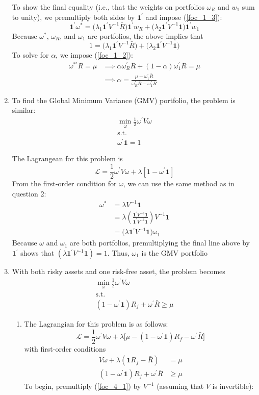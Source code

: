 \documentclass[11pt]{article}
\newcommand{\w}{\omega}
\newcommand{\p}{\prime}
\newcommand{\one}{\mathbf{1}}
\newcommand{\onep}{\mathbf{1}^\prime}
\newcommand{\lagr}{\mathcal{L}}
\newcommand{\inv}[1]{#1^{-1}}
\renewcommand{\wp}{\omega^\prime}
\begin{document}
\begin{enumerate}
	To show the final equality (i.e., that the weights on portfolios $ \w_R $ and $ w_1 $ sum to unity), we premultiply both sides by $ \one^\p $ and impose  (\ref{foc_1_3}):
	\[\onep \w^*= \big(\lambda_1\one^\p \inv{V}\bar{R}\big)\onep w_R + \big(\lambda_2\one^\p \inv{V}\one\big)\onep w_1 \]
	Because $ \w^* $, $ \w_R $, and $ \w_1 $ are portfolios, the above implies that 
	\[1 = \big(\lambda_1\one^\p \inv{V}\bar{R}\big) + \big(\lambda_2\one^\p \inv{V}\one\big)\]
	To solve for $\alpha$, we impose (\ref{foc_1_2}):
	\begin{align*}
	\w^{*\p}\bar{R} = \mu &\implies \alpha \w_R^\p \bar{R} + (1 - \alpha) \w_1^\p \bar{R} = \mu \\
	& \implies \alpha = \frac{\mu - \w_1^\p \bar{R}}{\w_R^\p \bar{R} - \w_1^\p \bar{R}}
	\end{align*}
	
	\item To find the Global Minimum Variance (GMV) portfolio, the problem is similar:
	\begin{gather*}
	\min_\w \frac{1}{2}\w^\p V \w \\
	\text{s.t.} \\
	\w^\p \one = 1
	\end{gather*}
	
	The Lagrangean for this problem is 
	\[\lagr = \frac{1}{2} \wp V \w + \lambda[1 - \wp \one ]\]
	From the first-order condition for $\omega$, we can use the same method as in question 2:
	\begin{align*}
	\w^* &= \lambda \inv{V} \one  \\
	&= \lambda\left(\frac{\one^\p \inv{V}\one}{\one^\p \inv{V}\one}\right)\inv{V}\one \\
	&= \big(\lambda \onep \inv{V}\one \big)\w_1
	\end{align*}
	Because $ \w $ and $ \w_1 $ are both portfolios, premultiplying the final line above by $ \onep $ shows that $ (\lambda \onep \inv{V}\one) = 1 $. Thus, $ \w_1 $ is the GMV portfolio
	
	\item With both risky assets and one risk-free asset, the problem becomes
	\begin{gather*}
	\min_\w \frac{1}{2}\w^\p V \w \\
	\text{s.t.} \\
	(1 - \w^\p \one)R_f + \w^\p \bar{R} \geq \mu
	\end{gather*}
	\begin{enumerate}
		\item The Lagrangian for this problem is as follows:
		\[\lagr = \frac{1}{2}\w^\p V \w + \lambda \big[\mu - (1 - \w^\p \one)R_f - \w^\p \bar{R}\big] \]
		with first-order conditions
		\begin{align}
		V\w + \lambda(\one R_f - \bar{R}) &= \mu \label{foc_4_1}\\
		(1 - \w^\p \one)R_f + \w^\p \bar{R} &\geq \mu \label{foc_4_2}
		\end{align}
		To begin, premultiply (\ref{foc_4_1}) by $ \inv{V} $ (assuming that $ V $ is invertible):


\end{enumerate}
\end{enumerate}
\end{document}
